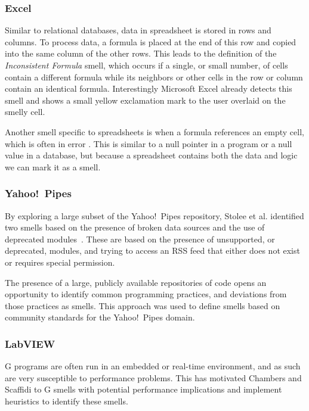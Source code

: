 \documentclass[10pt,conference,compsocconf]{IEEEtran}
\begin{document}
\subsubsection{Excel}

Similar to relational databases, data in spreadsheet is stored in rows and columns.
To process data, a formula is placed at the end of this row and copied into the same column of the other rows.
This leads to the definition of the \emph{Inconsistent Formula} smell, which occurs if a single, or small number, of cells contain a different formula while its neighbors or other cells in the row or column contain an identical formula.
Interestingly Microsoft Excel already detects this smell and shows a small yellow exclamation mark to the user overlaid on the smelly cell.

Another smell specific to spreadsheets is when a formula references an empty cell, which is often in error \cite{cunha2012towards}.
This is similar to a null pointer in a program or a null value in a database, but because a spreadsheet contains both the data and logic we can mark it as a smell.

\subsubsection{Yahoo!\ Pipes}
By exploring a large subset of the Yahoo!\ Pipes repository, Stolee et al. identified two smells based on the presence of broken data sources and the use of deprecated modules~\cite{StoleeTSE2013}. These are based on the presence of unsupported, or deprecated, modules, and trying to access an RSS feed that either does not exist or requires special permission. 

The presence of a large, publicly available repositories of code opens an opportunity to identify common programming practices, and deviations from those practices as smells. This approach was used to define smells based on community standards for the Yahoo!\ Pipes domain. 



\subsubsection{LabVIEW}

G programs are often run in an embedded or real-time environment, and as such are very susceptible to performance problems. This has motivated Chambers and Scaffidi \cite{chambers2013smell} to G smells with potential performance implications and implement heuristics to identify these smells.
\end{document}
